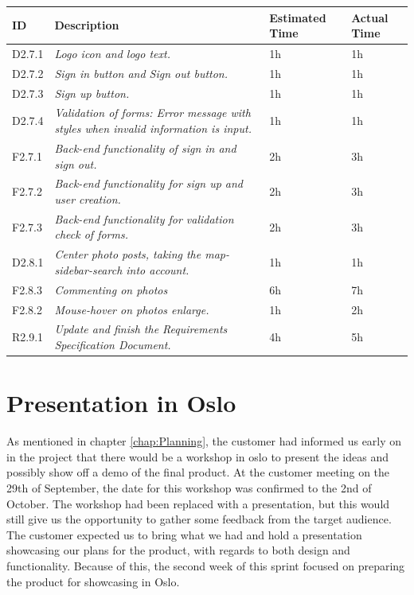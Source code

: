 \begin{minipage}{\linewidth}
\setlength{\tabcolsep}{12pt}
\centering
{}
\begin{tabular}{|p{1cm}|p{4cm}|p{2cm}|p{2cm}|}
\hline
\cellcolor{gray!25} ID & \cellcolor{gray!25} Description & \cellcolor{gray!25} Estimated Time & \cellcolor{gray!25} Actual Time \\
\hline
D2.7.1 & \it{Logo icon and logo text.} & 1h & 1h \\
D2.7.2 & \it{Sign in button and Sign out button.} & 1h & 1h \\
D2.7.3 & \it{Sign up button.} & 1h & 1h \\
D2.7.4 & \it{Validation of forms: Error message with styles when invalid information is input.} & 1h & 1h \\
F2.7.1 & \it{Back-end functionality of sign in and sign out.} & 2h & 3h \\
F2.7.2 & \it{Back-end functionality for sign up and user creation.} & 2h & 3h \\
F2.7.3 & \it{Back-end functionality for validation check of forms.} & 2h & 3h \\
D2.8.1 & \it{Center photo posts, taking the map-sidebar-search into account.} & 1h & 1h \\
F2.8.3 & \it{Commenting on photos} & 6h & 7h \\
F2.8.2 & \it{Mouse-hover on photos enlarge.} & 1h & 2h \\
R2.9.1 & \it{Update and finish the Requirements Specification Document.} & 4h & 5h \\
\hline
\end{tabular}
\end{minipage}

\section{Presentation in Oslo}
\label{sec:S2Presentation}

As mentioned in chapter \ref{chap:Planning}, the customer had informed us early on in the project that there would be a workshop in oslo to present the ideas and possibly show off a demo of the final product. At the customer meeting on the 29th of September, the date for this workshop was confirmed to the 2nd of October. The workshop had been replaced with a presentation, but this would still give us the opportunity to gather some feedback from the target audience. The customer expected us to bring what we had and hold a presentation showcasing our plans for the product, with regards to both design and functionality. Because of this, the second week of this sprint focused on preparing the product for showcasing in Oslo.

